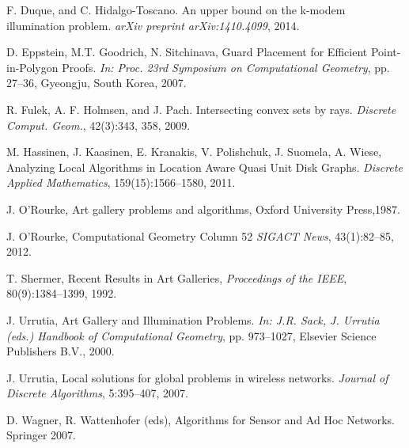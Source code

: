 \documentclass[A4]{article}
\begin{document}
\begin{thebibliography}{}
         F. Duque, and C. Hidalgo-Toscano.
         An upper bound on the k-modem illumination problem.
         \emph{arXiv preprint arXiv:1410.4099}, 2014.

	D. Eppstein, M.T. Goodrich, N. Sitchinava,
	Guard Placement for Efficient Point-in-Polygon Proofs.
	\emph{In: Proc. 23rd Symposium on Computational Geometry}, 
	pp. 27--36, 
	Gyeongju, South Korea,
	2007.

	R. Fulek, A. F. Holmsen, and J. Pach. 
	Intersecting convex sets by rays. 
	\emph{Discrete Comput. Geom.}, 
	42(3):343, 358, 2009. 

	M. Hassinen, J. Kaasinen, E. Kranakis, V. Polishchuk, J. Suomela, A. Wiese, 
	Analyzing Local Algorithms in Location Aware Quasi Unit Disk Graphs. 
	\emph{Discrete Applied Mathematics}, 159(15):1566--1580, 2011.

	J. O'Rourke,
	Art gallery problems and algorithms,
	Oxford University Press,1987.

	J. O'Rourke, 
	Computational Geometry Column 52
	\emph{SIGACT News}, 43(1):82--85, 2012. 


	T. Shermer, 
	Recent Results in Art Galleries, 
	\emph{Proceedings of the IEEE}, 80(9):1384--1399, 1992.

	J. Urrutia,
	Art Gallery and Illumination Problems.
	\emph{In: J.R. Sack, J. Urrutia (eds.) Handbook of Computational Geometry},
	pp. 973--1027, Elsevier Science Publishers B.V., 2000.

	J. Urrutia, 
	Local solutions for global problems in wireless networks. 
	\emph{Journal of Discrete Algorithms}, 5:395--407, 2007.

D. Wagner, R. Wattenhofer (eds), 
	Algorithms for Sensor and Ad Hoc Networks. 
	Springer 2007.



	



\end{thebibliography}
\end{document}
